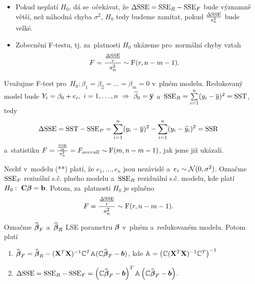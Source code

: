 \begin{itemize}
	\item Pokud neplatí $H_0$, dá se~očekávat, že $\Delta\mathrm{SSE} = \mathrm{SSE}_R-\mathrm{SSE}_F$ bude významně větší, než náhodná chyba $\sigma^2$, $H_0$ tedy budeme zamítat, pokud $\frac{\Delta\mathrm{SSE}}{s_n^2}$ bude velké.
	\item Zobecnění F-testu, tj. za~platnosti $H_0$ ukázeme pro~normální chyby vztah
	 $$ F = \frac{\frac{\Delta\mathrm{SSE}}{r}}{s_n^2}\sim\mathrm{F}(r,n-m-1). $$
\end{itemize}
\begin{example}
	Uvažujme F-test pro~$H_0:\beta_1 = \beta_2 = ... = \beta_m = 0$ v~plném modelu. Redukovaný model bude $Y_i = \beta_0+e_i,~i = 1,\dots,n~\Rightarrow~\widehat{\beta}_0 = \overline{\mathbf{y}}$ a~$\mathrm{SSE}_R = \sum\limits_{i=1}^{n} (y_i-\overline{y})^2 = \mathrm{SST}$, tedy
	 $$ \Delta \mathrm{SSE} = \mathrm{SST}-\mathrm{SSE}_P = \sum\limits_{i=1}^{n} (y_i-\overline{y})^2-\sum\limits_{i=1}^{n} (y_i-\widehat{y}_i)^2 = \mathrm{SSR} $$
	 a~statistiku $F = \frac{\frac{\mathrm{SSR}}{m}}{s_n^2} = F_{overall}\sim\mathrm{F}(m,n-m-1)$, jak jsme již ukázali.
\end{example}
\begin{theorem}
	Nechť v~modelu (**) platí, že $e_1,\dots,e_n$ jsou nezávislé a~$e_i\sim\mathcal{N}(0,\sigma^2)$. Označme $\mathrm{SSE}_F$ reziuální s.č. plného modelu a~$\mathrm{SSE}_R$ reziduální s.č. modelu, kde platí $H_0:~\textbf{C}\boldsymbol{\beta} = \textbf{b}$. Potom, za~platnosti $H_0$ je splněno
	 $$ F = \frac{\frac{\Delta\mathrm{SSE}}{r}}{s_n^2}\sim\mathrm{F}(r,n-m-1). $$
\end{theorem}\newcommand{\bb}{\boldsymbol{b}}
\newcommand{\yb}{\boldsymbol{y}}
\newcommand{\lambdab}{\boldsymbol{\lambda}}
\newcommand{\xtx}{(\X^T \X)^{-1}}
\newcommand{\parcialni}[2]{\frac{\partial #1}{\partial #2}}

\begin{lemma}
	Označme $\widehat{\boldsymbol{\beta}}_F$ a~$\widehat{\boldsymbol{\beta}}_R$ LSE parametru $\boldsymbol{\beta}$ v~plném a~redukovaném modelu. Potom platí
	\begin{enumerate}
		\item $\wbetab_F = \wbetab_R - (\X^T \X)^{-1} \C^T \Am (\C \wbetab_F - \bb)$, kde $\mathbb{A} = \left(\mathbb{C} (\mathbf{X}^T \mathbf{X})^{-1} \mathbb{C}^T \right)^{-1}$
		\item $\Delta \SSE = \SSE_R - \SSE_F = \left(\C \wbetab_F - \bb \right)^T \Am \left(\C \wbetab_F - \bb \right)$.
	\end{enumerate}
\end{lemma}

